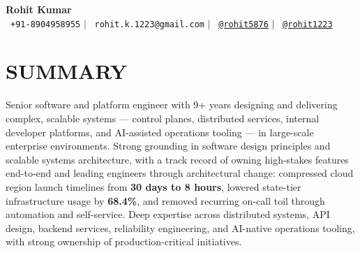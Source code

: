 \documentclass[letterpaper,11pt]{article}
\begin{document}
\begin{center}
    \textbf{\Huge Rohit Kumar} \\ \vspace{5pt}
    \small \faPhone*\ \texttt{+91-8904958955} \hspace{1pt} $|$
    \hspace{1pt} \faEnvelope\ \texttt{rohit.k.1223@gmail.com} \hspace{1pt} $|$
    \hspace{1pt} \faLinkedin\ \href{https://www.linkedin.com/in/rohit5876}{\texttt{@rohit5876}} \hspace{1pt} $|$
    \hspace{1pt} \faGithub\ \href{https://github.com/rohit1223}{\texttt{@rohit1223}} \hspace{1pt} \\ \vspace{-3pt}
\end{center}

\section{SUMMARY}
\begin{itemize}[leftmargin=0in, label={}]
    \small{\item{Senior software and platform engineer with 9+ years designing and delivering complex, scalable systems --- control planes, distributed services, internal developer platforms, and AI-assisted operations tooling --- in large-scale enterprise environments. Strong grounding in software design principles and scalable systems architecture, with a track record of owning high-stakes features end-to-end and leading engineers through architectural change: compressed cloud region launch timelines from \textbf{30 days to 8 hours}, lowered state-tier infrastructure usage by \textbf{68.4\%}, and removed recurring on-call toil through automation and self-service. Deep expertise across distributed systems, API design, backend services, reliability engineering, and AI-native operations tooling, with strong ownership of production-critical initiatives.}}
\end{itemize}

\end{document}
